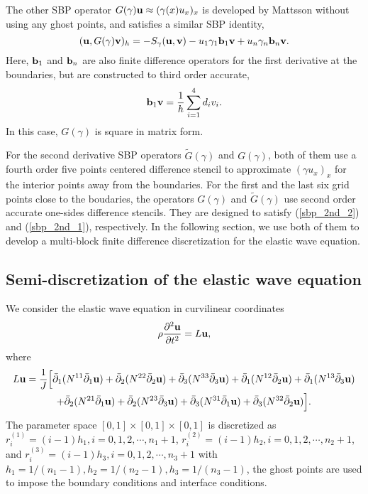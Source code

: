 \documentclass[a4paper]{article}
\newcommand{\wt}{\widetilde}
\begin{document}
The other SBP operator ${G}(\gamma){\bf u} \approx (\gamma(x)u_x)_x $ is developed by Mattsson \cite{?} without using any ghost points, and satisfies a similar SBP identity,
\begin{equation}\label{sbp_2nd_2}
({\bf u}, G(\gamma){\bf v})_h = -S_\gamma({\bf u},{\bf v})-u_1\gamma_1{\bf b}_1{\bf v} + u_n\gamma_n{\bf b}_n{\bf v}.
\end{equation}
Here, ${\bf b}_1$ and ${\bf b}_n$ are also finite difference operators for the first derivative at the boundaries, but are constructed to third order accurate,
\[
{\bf b}_1 {\bf v} = \frac{1}{h}\sum_{i=1}^{4} d_i v_i. 
\]
In this case, ${G}(\gamma)$ is square in matrix form. 


For the second derivative SBP operators $\wt{G}(\gamma)$ and $G(\gamma)$, both of them use a fourth order five points centered difference stencil to approximate $(\gamma u_x)_x$ for the interior points away from the boundaries. For the first and the last six grid points close to the boudaries, the operators $G(\gamma)$ and $\wt{G}(\gamma)$ use second order accurate one-sides difference stencils. They are designed to satisfy (\ref{sbp_2nd_2}) and (\ref{sbp_2nd_1}), respectively. In the following section, we use both of them to develop a multi-block finite difference discretization for the elastic wave equation. 


\subsection{Semi-discretization of the elastic wave equation}
We consider the elastic wave equation in curvilinear coordinates 
\[\rho\frac{\partial^2 {\bf u}}{\partial t^2} = L{\bf u},\]
where
\begin{multline}\label{spatial_operator}
L{\bf u} = \frac{1}{J}\Big[\bar{\partial}_1(N^{11}\bar{\partial}_1{\bf u}) + \bar{\partial}_2(N^{22}\bar{\partial}_2{\bf u}) + \bar{\partial}_3(N^{33}\bar{\partial}_3{\bf u}) + \bar{\partial}_1(N^{12}\bar{\partial}_2{\bf u}) + \bar{\partial}_1(N^{13}\bar{\partial}_3{\bf u}) \\
+ \bar{\partial}_2(N^{21}\bar{\partial}_1{\bf u}) + \bar{\partial}_2(N^{23}\bar{\partial}_3{\bf u}) +\bar{\partial}_3(N^{31}\bar{\partial}_1{\bf u}) + \bar{\partial}_3(N^{32}\bar{\partial}_2{\bf u})\Big].
\end{multline}
The parameter space $[0,1]\times[0,1]\times[0,1]$ is discretized as $r_i^{(1)} = (i-1)h_1, i = 0,1,2,\cdots,n_1+1$, $r_i^{(2)} = (i-1)h_2, i = 0,1,2,\cdots,n_2+1$, and $r_i^{(3)} = (i-1)h_3, i = 0,1,2,\cdots,n_3+1$ with $h_1 = 1/(n_1-1), h_2 = 1/(n_2-1), h_3 = 1/(n_3-1)$, the ghost points are used to impose the boundary conditions and interface conditions.
\end{document}
